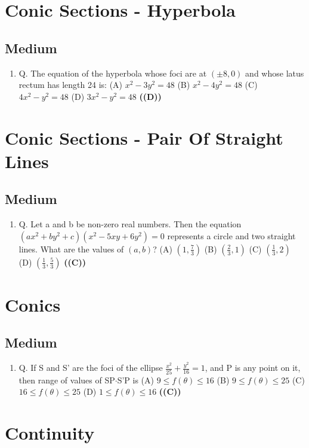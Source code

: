 \documentclass{article}
\begin{document}
\section{Conic Sections - Hyperbola}
\subsection{Medium}
\begin{enumerate}
\item Q. The equation of the hyperbola whose foci are at $(\pm 8,0)$ and whose latus rectum has length 24 is:
(A) $x^2 - 3y^2 = 48$
(B) $x^2 - 4y^2 = 48$
(C) $4x^2 - y^2 = 48$
(D) $3x^2 - y^2 = 48$ \hfill \textbf{((D))}
\end{enumerate}
\section{Conic Sections - Pair Of Straight Lines}
\subsection{Medium}
\begin{enumerate}
\item Q. Let a and b be non-zero real numbers. Then the equation $(ax^2 + by^2 + c) (x^2 - 5xy + 6y^2) = 0$ represents a circle and two straight lines. What are the values of $(a,b)$?
(A) $(1, \frac{7}{3})$
(B) $(\frac{2}{3}, 1)$
(C) $(\frac{1}{3}, 2)$
(D) $(\frac{1}{3}, \frac{5}{3})$ \hfill \textbf{((C))}
\end{enumerate}
\section{Conics}
\subsection{Medium}
\begin{enumerate}
\item Q. If S and S' are the foci of the ellipse $\frac{x^2}{25} + \frac{y^2}{16} = 1$, and P is any point on it, then range of values of SP$\cdot$S'P is
(A) $9 \le f(\theta) \le 16$
(B) $9 \le f(\theta) \le 25$
(C) $16 \le f(\theta) \le 25$
(D) $1 \le f(\theta) \le 16$ \hfill \textbf{((C))}
\end{enumerate}
\section{Continuity}
\end{document}
